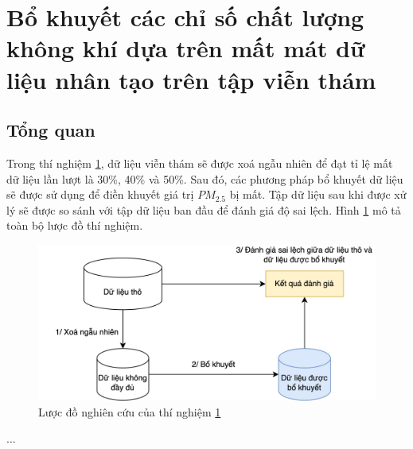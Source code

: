 \section{Bổ khuyết các chỉ số chất lượng không khí dựa trên mất mát dữ liệu nhân tạo trên tập viễn thám}\label{ex-3}
\subsection{Tổng quan}
Trong thí nghiệm \ref{ex-3}, dữ liệu viễn thám sẽ được xoá ngẫu nhiên để đạt tỉ lệ mất dữ liệu lần lượt là 30\%, 40\% và 50\%. Sau đó, các phương pháp bổ khuyết dữ liệu sẽ được sử dụng để điền khuyết giá trị $PM_{2.5}$ bị mất. Tập dữ liệu sau khi được xử lý sẽ được so sánh với tập dữ liệu ban đầu để đánh giá độ sai lệch. Hình \ref{fig:ex3_ex3} mô tả toàn bộ lược đồ thí nghiệm.
\begin{figure}[h]
    \centering
    \includegraphics[width=\linewidth]{image/section6_2/ex_vientham.drawio.png}
    \caption{Lược đồ nghiên cứu của thí nghiệm \ref{ex-3}}
    \label{fig:ex3_ex3}
\end{figure}

...

